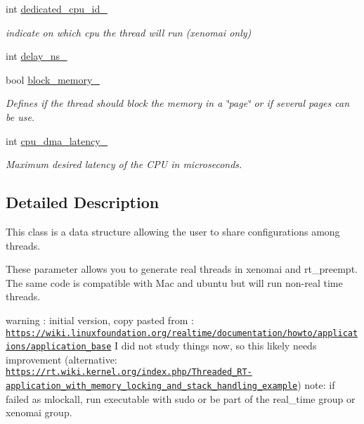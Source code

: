 \begin{DoxyCompactItemize}
int \hyperlink{classreal__time__tools_1_1RealTimeThreadParameters_a5a6b8b14d0e82962ae6e68d34086ffed}{dedicated\+\_\+cpu\+\_\+id\+\_\+}
\begin{DoxyCompactList}\small\item\em indicate on which cpu the thread will run (xenomai only) \end{DoxyCompactList}\item 
int \hyperlink{classreal__time__tools_1_1RealTimeThreadParameters_a50e8eae41f8284867f073aa802d9afa2}{delay\+\_\+ns\+\_\+}
\item 
bool \hyperlink{classreal__time__tools_1_1RealTimeThreadParameters_a134856e17552d3f31a093f3a1f5d1639}{block\+\_\+memory\+\_\+}
\begin{DoxyCompactList}\small\item\em Defines if the thread should block the memory in a \char`\"{}page\char`\"{} or if several pages can be use. \end{DoxyCompactList}\item 
int \hyperlink{classreal__time__tools_1_1RealTimeThreadParameters_afc9891b44025aab8b383e91d907d41b0}{cpu\+\_\+dma\+\_\+latency\+\_\+}
\begin{DoxyCompactList}\small\item\em Maximum desired latency of the C\+PU in microseconds. \end{DoxyCompactList}\end{DoxyCompactItemize}


\subsection{Detailed Description}
This class is a data structure allowing the user to share configurations among threads. 

These parameter allows you to generate real threads in xenomai and rt\+\_\+preempt. The same code is compatible with Mac and ubuntu but will run non-\/real time threads.

warning \+: initial version, copy pasted from \+: \href{https://wiki.linuxfoundation.org/realtime/documentation/howto/applications/application_base}{\tt https\+://wiki.\+linuxfoundation.\+org/realtime/documentation/howto/applications/application\+\_\+base} I did not study things now, so this likely needs improvement (alternative\+: \href{https://rt.wiki.kernel.org/index.php/Threaded_RT-application_with_memory_locking_and_stack_handling_example}{\tt https\+://rt.\+wiki.\+kernel.\+org/index.\+php/\+Threaded\+\_\+\+R\+T-\/application\+\_\+with\+\_\+memory\+\_\+locking\+\_\+and\+\_\+stack\+\_\+handling\+\_\+example}) note\+: if failed as mlockall, run executable with sudo or be part of the real\+\_\+time group or xenomai group. 

